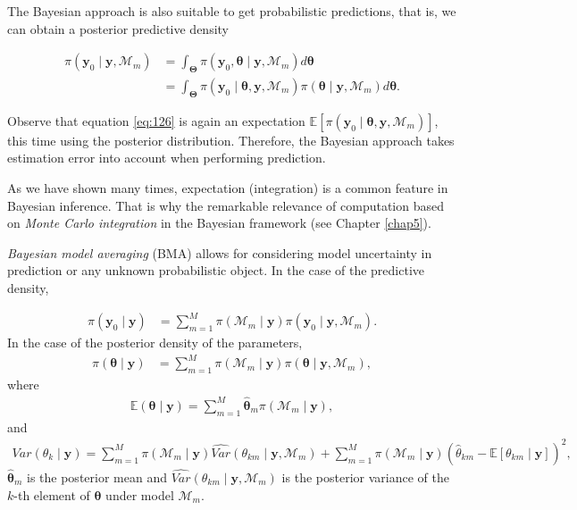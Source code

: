 The Bayesian approach is also suitable to get probabilistic predictions, that is, we can obtain a posterior predictive density 

\begin{align}
	\pi(\mathbf{y}_0\mid \mathbf{y},\mathcal{M}_m) & =\int_{\mathbf{\Theta}}\pi(\mathbf{y}_0,\bm{\theta}\mid \mathbf{y},\mathcal{M}_m)d\bm{\theta}\nonumber\\
	&=\int_{\mathbf{\Theta}}\pi(\mathbf{y}_0\mid \bm{\theta},\mathbf{y},\mathcal{M}_m)\pi(\bm{\theta}\mid \mathbf{y},\mathcal{M}_m)d\bm{\theta}.
	\label{eq:126}
\end{align}

Observe that equation \ref{eq:126} is again an expectation \( \mathbb{E}[\pi(\mathbf{y}_0 \mid \bm{\theta}, \mathbf{y}, \mathcal{M}_m)] \), this time using the posterior distribution. Therefore, the Bayesian approach takes estimation error into account when performing prediction.

As we have shown many times, expectation (integration) is a common feature in Bayesian inference. That is why the remarkable relevance of computation based on \textit{Monte Carlo integration} in the Bayesian framework (see Chapter \ref{chap5}).

\textit{Bayesian model averaging} (BMA) allows for considering model uncertainty in prediction or any unknown probabilistic object. In the case of the predictive density, 

\begin{align}
	\pi(\mathbf{y}_0\mid \mathbf{y})&=\sum_{m=1}^M \pi(\mathcal{M}_m\mid \mathbf{y})\pi(\mathbf{y}_0\mid \mathbf{y},\mathcal{M}_m).
\end{align}
In the case of the posterior density of the parameters,
\begin{align}
	\pi(\bm{\theta}\mid \mathbf{y})&=\sum_{m=1}^M \pi(\mathcal{M}_m\mid \mathbf{y})\pi(\bm{\theta}\mid \mathbf{y},\mathcal{M}_m),
\end{align}
where 
\begin{align}
	\mathbb{E}(\bm{\theta}\mid \mathbf{y})=\sum_{m=1}^{M}\hat{\bm{\theta}}_m \pi(\mathcal{M}_m\mid \mathbf{y}),
	\label{eq:127}
\end{align}
and
\begin{align}
	Var({\theta}_k\mid \mathbf{y})= \sum_{m=1}^{M}\pi(\mathcal{M}_m\mid \mathbf{y}) \widehat{Var} ({\theta}_{km}\mid \mathbf{y},\mathcal{M}_m)+\sum_{m=1}^{M} \pi(\mathcal{M}_m\mid \mathbf{y}) (\hat{{\theta}}_{km}-\mathbb{E}[{\theta}_{km}\mid \mathbf{y}])^2,
	\label{eq:128}
\end{align}
$\hat{\bm{\theta}}_m$ is the posterior mean and $\widehat{Var}({\theta}_{km}\mid \mathbf{y},\mathcal{M}_m)$ is the posterior variance of the $k$-th element of $\bm{\theta}$ under model $\mathcal{M}_m$.

